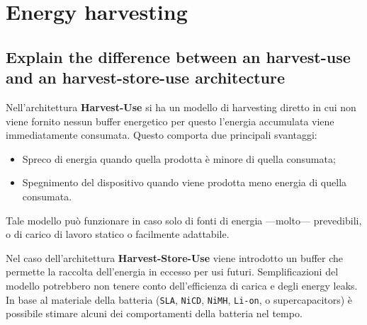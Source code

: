 \section{Energy harvesting}

\subsection{Explain the difference between an harvest-use and an harvest-store-use architecture}

Nell'architettura \textbf{Harvest-Use} si ha un modello di harvesting diretto in cui non viene fornito nessun buffer energetico per questo l'energia accumulata viene immediatamente consumata. Questo comporta due principali svantaggi:
{\ns\begin{itemize}
   \item Spreco di energia quando quella prodotta è minore di quella consumata;   
   \item Spegnimento del dispositivo quando viene prodotta meno energia di quella consumata.
\end{itemize}}
Tale modello può funzionare in caso solo di fonti di energia ---molto--- prevedibili, o di carico di lavoro statico o facilmente adattabile.
   
      
Nel caso dell'architettura \textbf{Harvest-Store-Use} viene introdotto un buffer che permette la raccolta dell'energia in eccesso per usi futuri. 
Semplificazioni del modello potrebbero non tenere conto dell'efficienza di carica e degli energy leaks.
In base al materiale della batteria (\texttt{SLA}, \texttt{NiCD}, \texttt{NiMH}, \texttt{Li-on}, o supercapacitors) è possibile stimare alcuni dei comportamenti della batteria nel tempo.



